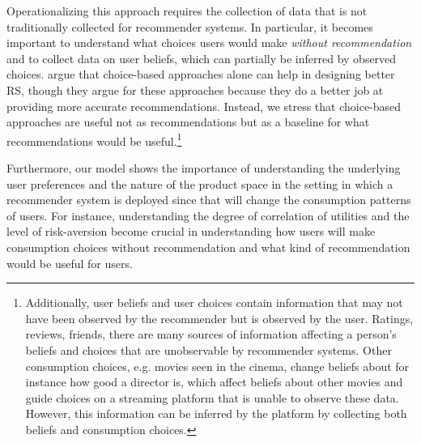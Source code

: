 \documentclass[sigconf]{acmart}
\begin{document}
Operationalizing this approach requires the collection of data that is not traditionally collected for recommender systems. In particular, it becomes important to understand what choices users would make \textit{without recommendation} and to collect data on user beliefs, which can partially be inferred by observed choices. \cite{jiang2014choice, saavedra2016choice} argue that choice-based approaches alone can help in designing better RS, though they argue for these approaches because they do a better job at providing more accurate recommendations. Instead, we stress that choice-based approaches are useful not as recommendations but as a baseline for what recommendations would be useful.\footnote{Additionally, user beliefs and user choices contain information that may not have been observed by the recommender but is observed by the user. Ratings, reviews, friends, there are many sources of information affecting a person's beliefs and choices that are unobservable by recommender systems. Other consumption choices, e.g. movies seen in the cinema, change beliefs about for instance how good a director is, which affect beliefs about other movies and guide choices on a streaming platform that is unable to observe these data. However, this information can be inferred by the platform by collecting both beliefs and consumption choices.}
\par

Furthermore, our model shows the importance of understanding the underlying user preferences and the nature of the product space in the setting in which a recommender system is deployed since that will change the consumption patterns of users. For instance, understanding the degree of correlation of utilities and the level of risk-aversion become crucial in understanding how users will make consumption choices without recommendation and what kind of recommendation would be useful for users.
\par
\end{document}
